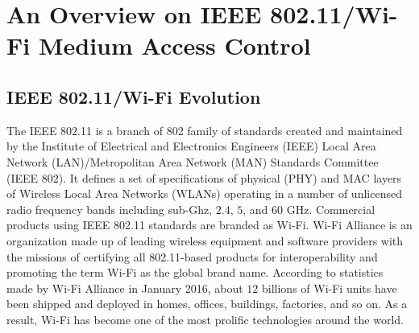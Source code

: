 %
%
%
\chapter{An Overview on IEEE 802.11/Wi-Fi Medium Access Control}
\label{overview-wifi}


\section{IEEE 802.11/Wi-Fi Evolution}
\label{wifi-lbt}

The IEEE 802.11 is a branch of 802 family of standards created and maintained by the Institute of Electrical and Electronics Engineers (IEEE) Local Area Network (LAN)/Metropolitan Area Network (MAN) Standards Committee (IEEE 802). It defines a set of specifications of physical (PHY) and MAC layers of Wireless Local Area Networks (WLANs) operating in a number of unlicensed radio frequency bands including sub-Ghz, $2.4$, $5$, and $60$ GHz. Commercial products using IEEE 802.11 standards are branded as Wi-Fi. Wi-Fi Alliance is an organization made up of leading wireless equipment and software providers with the missions of certifying all 802.11-based products for interoperability and promoting the term Wi-Fi as the global brand name. According to statistics made by Wi-Fi Alliance in January 2016, about $12$ billions of Wi-Fi units have been shipped and deployed in homes, offices, buil\textit{}dings, factories, and so on. As a result, Wi-Fi has become one of the most prolific technologies around the world. 

